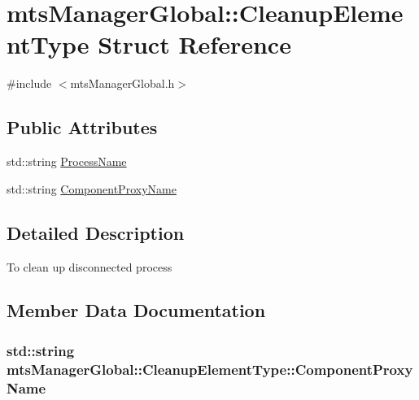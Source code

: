 \hypertarget{structmts_manager_global_1_1_cleanup_element_type}{}\section{mts\+Manager\+Global\+:\+:Cleanup\+Element\+Type Struct Reference}
\label{structmts_manager_global_1_1_cleanup_element_type}


{\ttfamily \#include $<$mts\+Manager\+Global.\+h$>$}

\subsection*{Public Attributes}
\begin{DoxyCompactItemize}
\item 
std\+::string \hyperlink{structmts_manager_global_1_1_cleanup_element_type_a0cf55ba12a11d5de8a7f703e5358caca}{Process\+Name}
\item 
std\+::string \hyperlink{structmts_manager_global_1_1_cleanup_element_type_abcd5b7bcbc69b8cc83441b0aaf489820}{Component\+Proxy\+Name}
\end{DoxyCompactItemize}


\subsection{Detailed Description}
To clean up disconnected process 

\subsection{Member Data Documentation}
\hypertarget{structmts_manager_global_1_1_cleanup_element_type_abcd5b7bcbc69b8cc83441b0aaf489820}{}
\subsubsection[{Component\+Proxy\+Name}]{\setlength{\rightskip}{0pt plus 5cm}std\+::string mts\+Manager\+Global\+::\+Cleanup\+Element\+Type\+::\+Component\+Proxy\+Name}\label{structmts_manager_global_1_1_cleanup_element_type_abcd5b7bcbc69b8cc83441b0aaf489820}
\hypertarget{structmts_manager_global_1_1_cleanup_element_type_a0cf55ba12a11d5de8a7f703e5358caca}{}
